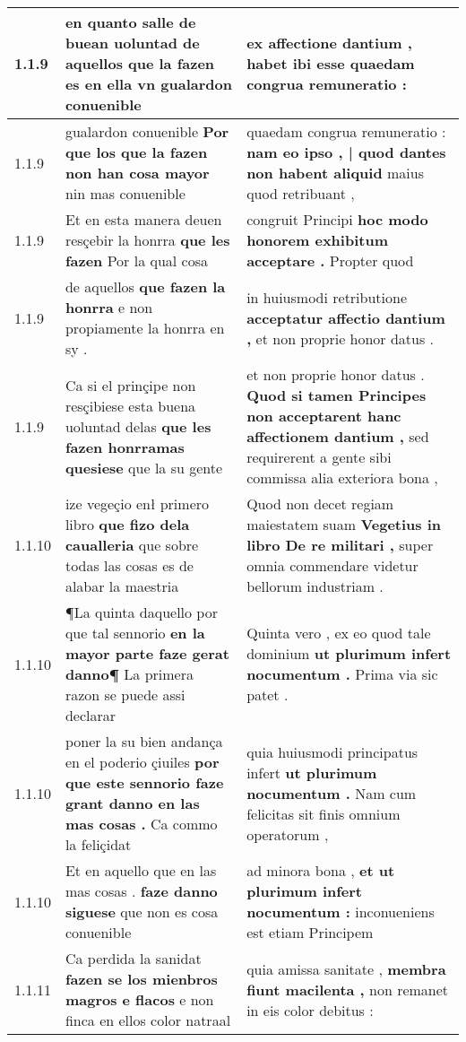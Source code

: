 \begin{tabular}{|p{1cm}|p{6.5cm}|p{6.5cm}|}
1.1.9 & en quanto salle de buean uoluntad \textbf{ de aquellos que la fazen es en ella vn } gualardon conuenible & ex affectione dantium , \textbf{ habet ibi esse } quaedam congrua remuneratio : \\\hline
1.1.9 & gualardon conuenible \textbf{ Por que los que la fazen non han cosa mayor } nin mas conuenible & quaedam congrua remuneratio : \textbf{ nam eo ipso , | quod dantes non habent aliquid } maius quod retribuant , \\\hline
1.1.9 & Et en esta manera deuen resçebir la honrra \textbf{ que les fazen } Por la qual cosa & congruit Principi \textbf{ hoc modo honorem exhibitum acceptare . } Propter quod \\\hline
1.1.9 & de aquellos \textbf{ que fazen la honrra } e non propiamente la honrra en sy . & in huiusmodi retributione \textbf{ acceptatur affectio dantium , } et non proprie honor datus . \\\hline
1.1.9 & Ca si el prinçipe non resçibiese esta buena uoluntad delas \textbf{ que les fazen honrramas quesiese } que la su gente & et non proprie honor datus . \textbf{ Quod si tamen Principes non acceptarent hanc affectionem dantium , } sed requirerent a gente sibi commissa alia exteriora bona , \\\hline
1.1.10 & ize vegeçio enł primero libro \textbf{ que fizo dela caualleria } que sobre todas las cosas es de alabar la maestria & Quod non decet regiam maiestatem suam \textbf{ Vegetius in libro De re militari , } super omnia commendare videtur bellorum industriam . \\\hline
1.1.10 & ¶La quinta daquello por que tal sennorio \textbf{ en la mayor parte faze gerat danno¶ } La primera razon se puede assi declarar & Quinta vero , ex eo quod tale dominium \textbf{ ut plurimum infert nocumentum . } Prima via sic patet . \\\hline
1.1.10 & poner la su bien andança en el poderio çiuiles \textbf{ por que este sennorio faze grant danno en las mas cosas . } Ca commo la feliçidat & quia huiusmodi principatus infert \textbf{ ut plurimum nocumentum . } Nam cum felicitas sit finis omnium operatorum , \\\hline
1.1.10 & Et en aquello que en las mas cosas . \textbf{ faze danno siguese } que non es cosa conuenible & ad minora bona , \textbf{ et ut plurimum infert nocumentum : } inconueniens est etiam Principem \\\hline
1.1.11 & Ca perdida la sanidat \textbf{ fazen se los mienbros magros e flacos } e non finca en ellos color natraal & quia amissa sanitate , \textbf{ membra fiunt macilenta , } non remanet in eis color debitus : \\\hline

\end{tabular}
